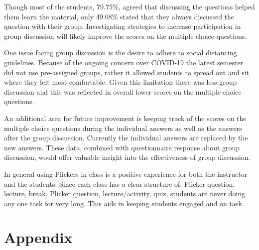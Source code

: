 \documentclass[12pt]{article}
\begin{document}
Though most of the students, 79.75\%, agreed that discussing the questions helped them learn the material, only 49.08\% stated that they always discussed the question with their group. Investigating strategies to increase participation in group discussion will likely improve the scores on the multiple choice questions.

One issue facing group discussion is the desire to adhere to social distancing guidelines. Because of the ongoing concern over COVID-19 the latest semester did not use pre-assigned groups, rather it allowed students to spread out and sit where they felt most comfortable. Given this limitation there was less group discussion and this was reflected in overall lower scores on the multiple-choice questions. 

An additional area for future improvement is keeping track of the scores on the multiple choice questions during the individual answers as well as the answers after the group discussion. Currently the individual answers are replaced by the new answers. These data, combined with questionnaire response about group discussion, would offer valuable insight into the effectiveness of group discussion.

In general using Plickers in class is a positive experience for both the instructor and the students. Since each class has a clear structure of: Plicker question, lecture, break, Plicker question, lecture/activity, quiz, students are never doing any one task for very long. This aids in keeping students engaged and on task.


\vspace{4\baselineskip}\vspace{-\parskip} %
\footnotesize %



\section*{Appendix}
\end{document}
